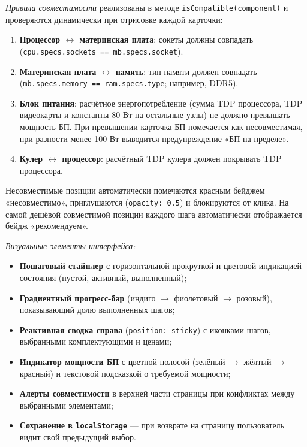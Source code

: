 \documentclass[14pt, a4paper]{extarticle}
\begin{document}
\emph{Правила совместимости} реализованы в методе \texttt{isCompatible(component)} и проверяются динамически при отрисовке каждой карточки:
\begin{enumerate}
    \item \textbf{Процессор $\leftrightarrow$ материнская плата}: сокеты должны совпадать (\texttt{cpu.specs.sockets == mb.specs.socket}).
    \item \textbf{Материнская плата $\leftrightarrow$ память}: тип памяти должен совпадать (\texttt{mb.specs.memory == ram.specs.type}; например, DDR5).
    \item \textbf{Блок питания}: расчётное энергопотребление (сумма TDP процессора, TDP видеокарты и константы 80 Вт на остальные узлы) не должно превышать мощность БП. При превышении карточка БП помечается как несовместимая, при разности менее 100 Вт выводится предупреждение «БП на пределе».
    \item \textbf{Кулер $\leftrightarrow$ процессор}: расчётный TDP кулера должен покрывать TDP процессора.
\end{enumerate}

Несовместимые позиции автоматически помечаются красным бейджем «несовместимо», приглушаются (\texttt{opacity: 0.5}) и блокируются от клика. На самой дешёвой совместимой позиции каждого шага автоматически отображается бейдж «рекомендуем».

\emph{Визуальные элементы интерфейса:}
\begin{itemize}
    \item \textbf{Пошаговый стайплер} с горизонтальной прокруткой и цветовой индикацией состояния (пустой, активный, выполненный);
    \item \textbf{Градиентный прогресс-бар} (индиго $\rightarrow$ фиолетовый $\rightarrow$ розовый), показывающий долю выполненных шагов;
    \item \textbf{Реактивная сводка справа} (\texttt{position: sticky}) с иконками шагов, выбранными комплектующими и ценами;
    \item \textbf{Индикатор мощности БП} с цветной полосой (зелёный $\rightarrow$ жёлтый $\rightarrow$ красный) и текстовой подсказкой о требуемой мощности;
    \item \textbf{Алерты совместимости} в верхней части страницы при конфликтах между выбранными элементами;
    \item \textbf{Сохранение в \texttt{localStorage}} --- при возврате на страницу пользователь видит свой предыдущий выбор.
\end{itemize}
\end{document}

